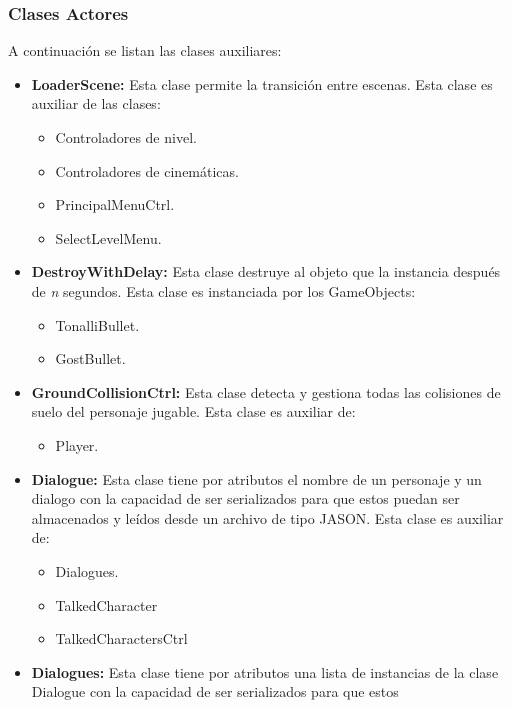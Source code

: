 \subsubsection{Clases Actores}
A continuación se listan las clases auxiliares: 
		\begin{itemize}
			\item \textbf{LoaderScene:} Esta clase permite la transición 
			entre escenas. Esta clase es auxiliar de las clases:
			\begin{itemize}
				\item Controladores de nivel.
				\item Controladores de cinemáticas.
				\item PrincipalMenuCtrl.
				\item SelectLevelMenu.
			\end{itemize}
			\item \textbf{DestroyWithDelay:} Esta clase destruye al objeto que la 
			instancia después de \textit{n} segundos. Esta clase es instanciada por 
			los GameObjects:
			\begin{itemize}
				\item TonalliBullet.
				\item GostBullet.
			\end{itemize}
			\item \textbf{GroundCollisionCtrl:} Esta clase detecta y gestiona todas las 
			colisiones de suelo del personaje jugable. Esta clase es auxiliar de:
			\begin{itemize}
				\item Player.
			\end{itemize}
			\item \textbf{Dialogue:} Esta clase tiene por atributos el nombre de un 
			personaje y un dialogo con la capacidad de ser serializados para que estos 
			puedan ser almacenados y leídos desde un archivo de tipo JASON. Esta clase 
			es auxiliar de:
			\begin{itemize}
				\item Dialogues.
				\item TalkedCharacter
				\item TalkedCharactersCtrl
			\end{itemize}
			\item \textbf{Dialogues:} Esta clase tiene por atributos una lista de instancias 
			de la clase Dialogue con la capacidad de ser serializados para que estos 

\end{itemize}
